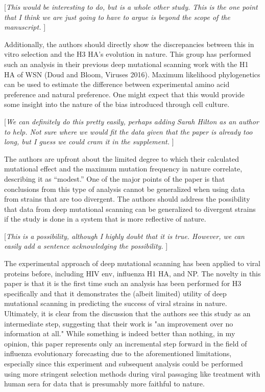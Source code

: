 \documentclass[11pt, oneside]{article}   	%
\newcommand{\comment}[1]{{\color{red}[\textsl{#1}]}}
\begin{document}
\comment{This would be interesting to do, but is a whole other study.
This is the one point that I think we are just going to have to argue is beyond the scope of the manuscript.
}

Additionally, the authors should directly show the discrepancies between this in vitro selection and the H3 HA's evolution in nature. This group has performed such an analysis in their previous deep mutational scanning work with the H1 HA of WSN (Doud and Bloom, Viruses 2016). Maximum likelihood phylogenetics can be used to estimate the difference between experimental amino acid preference and natural preference. One might expect that this would provide some insight into the nature of the bias introduced through cell culture. 

\comment{We can definitely do this pretty easily, perhaps adding Sarah Hilton as an author to help.
Not sure where we would fit the data given that the paper is already too long, but I guess we could cram it in the supplement.
}

The authors are upfront about the limited degree to which their calculated mutational effect and the maximum mutation frequency in nature correlate, describing it as ``modest.'' One of the major points of the paper is that conclusions from this type of analysis cannot be generalized when using data from strains that are too divergent. The authors should address the possibility that data from deep mutational scanning can be generalized to divergent strains if the study is done in a system that is more reflective of nature. 

\comment{This is a possibility, although I highly doubt that it is true.
However, we can easily add a sentence acknowledging the possibility.
}

The experimental approach of deep mutational scanning has been applied to viral proteins before, including HIV env, influenza H1 HA, and NP. The novelty in this paper is that it is the first time such an analysis has been performed for H3 specifically and that it demonstrates the (albeit limited) utility of deep mutational scanning in predicting the success of viral strains in nature. Ultimately, it is clear from the discussion that the authors see this study as an intermediate step, suggesting that their work is "an improvement over no information at all." While something is indeed better than nothing, in my opinion, this paper represents only an incremental step forward in the field of influenza evolutionary forecasting due to the aforementioned limitations, especially since this experiment and subsequent analysis could be performed using more stringent selection methods during viral passaging like treatment with human sera for data that is presumably more faithful to nature. 
\end{document}
